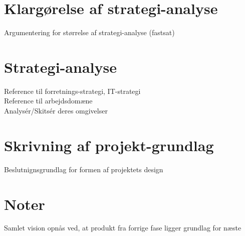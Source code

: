 \documentclass{article}
\begin{document}
\section{Klargørelse af strategi-analyse}

Argumentering for størrelse af strategi-analyse (fastsat)
\\

\section{Strategi-analyse}

Reference til forretnings-strategi, IT-strategi
\\
Reference til arbejdsdomæne
\\
Analysér/Skitsér deres omgivelser

\section{Skrivning af projekt-grundlag}

Beslutnignsgrundlag for formen af projektets design

\section{Noter}

Samlet vision opnås ved, at produkt fra forrige fase ligger grundlag for næste
\end{document}
